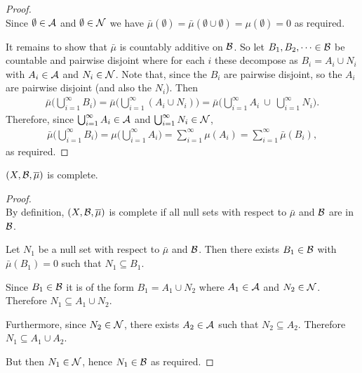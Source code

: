 \begin{proof}~\\
  Since $\emptyset \in \mathcal A$ and $\emptyset \in \mathcal N$ we
  have $\bar\mu(\emptyset) = \bar\mu(\emptyset \cup \emptyset) = \mu(\emptyset) = 0$ as required.

  It remains to show that $\bar\mu$ is countably additive on $\mathcal B$. So let $B_1, B_2, \dots \in \mathcal B$ be
  countable and pairwise disjoint where for each $i$ these decompose as $B_i = A_i \cup N_i$
  with $A_i \in \mathcal A$ and $N_i \in \mathcal N$. Note that, since the $B_i$ are pairwise disjoint, so the $A_i$ are
  pairwise disjoint (and also the $N_i$). Then
  \begin{align*}
    \bar\mu\Big(\bigcup_{i=1}^\infty B_i\Big)
    = \bar\mu\Big(\bigcup_{i=1}^\infty (A_i \cup N_i)\Big)
    = \bar\mu\Big(\bigcup_{i=1}^\infty A_i ~\cup~ \bigcup_{i=1}^\infty N_i\Big).
  \end{align*}
  Therefore, since $\bigcup_{i=1}^\infty A_i \in \mathcal A$ and $\bigcup_{i=1}^\infty N_i \in \mathcal N$,
  \begin{align*}
    \bar\mu\Big(\bigcup_{i=1}^\infty B_i\Big)
    = \mu\Big(\bigcup_{i=1}^\infty A_i\Big)
    = \sum_{i=1}^\infty \mu(A_i)
    = \sum_{i=1}^\infty \bar\mu(B_i),
  \end{align*}
  as required.
\end{proof}

\begin{claim*}
  $(X, \mathcal B, \overline{\mu})$ is complete.
\end{claim*}

\begin{proof}~\\
  By definition, $(X, \mathcal B, \overline{\mu})$ is complete if all null sets with respect to $\bar\mu$ and $\mathcal B$ are
  in $\mathcal B$.

  Let $N_1$ be a null set with respect to $\bar\mu$ and $\mathcal B$. Then there exists $B_1 \in \mathcal B$
  with $\bar\mu(B_1) = 0$ such that $N_1 \subseteq B_1$.

  Since $B_1 \in \mathcal B$ it is of the form $B_1 = A_1 \cup N_2$ where $A_1 \in \mathcal A$ and $N_2 \in \mathcal N$. Therefore
  $N_1 \subseteq A_1 \cup N_2$.

  Furthermore, since $N_2 \in \mathcal N$, there exists $A_2 \in \mathcal A$ such that $N_2 \subseteq A_2$.
  Therefore $N_1 \subseteq A_1 \cup A_2$.

  But then $N_1 \in \mathcal N$, hence $N_1 \in \mathcal B$ as required.
\end{proof}

